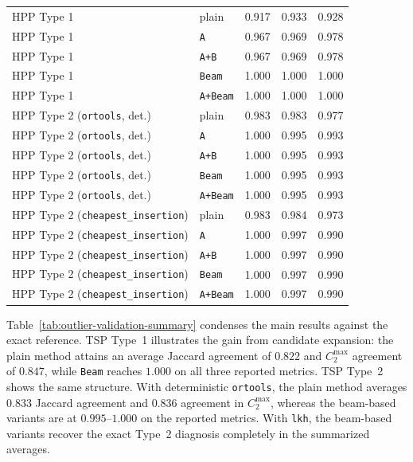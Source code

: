 \documentclass[preprint,12pt]{elsarticle}
\begin{document}
\begin{table}[htbp]
{\begin{tabular}{llccc}
\midrule
HPP Type 1 & plain & 0.917 & 0.933 & 0.928 \\
HPP Type 1 & \texttt{A} & 0.967 & 0.969 & 0.978 \\
HPP Type 1 & \texttt{A+B} & 0.967 & 0.969 & 0.978 \\
HPP Type 1 & \texttt{Beam} & 1.000 & 1.000 & 1.000 \\
HPP Type 1 & \texttt{A+Beam} & 1.000 & 1.000 & 1.000 \\
\midrule
HPP Type 2 (\texttt{ortools}, det.) & plain & 0.983 & 0.983 & 0.977 \\
HPP Type 2 (\texttt{ortools}, det.) & \texttt{A} & 1.000 & 0.995 & 0.993 \\
HPP Type 2 (\texttt{ortools}, det.) & \texttt{A+B} & 1.000 & 0.995 & 0.993 \\
HPP Type 2 (\texttt{ortools}, det.) & \texttt{Beam} & 1.000 & 0.995 & 0.993 \\
HPP Type 2 (\texttt{ortools}, det.) & \texttt{A+Beam} & 1.000 & 0.995 & 0.993 \\
\midrule
HPP Type 2 (\texttt{cheapest\_insertion}) & plain & 0.983 & 0.984 & 0.973 \\
HPP Type 2 (\texttt{cheapest\_insertion}) & \texttt{A} & 1.000 & 0.997 & 0.990 \\
HPP Type 2 (\texttt{cheapest\_insertion}) & \texttt{A+B} & 1.000 & 0.997 & 0.990 \\
HPP Type 2 (\texttt{cheapest\_insertion}) & \texttt{Beam} & 1.000 & 0.997 & 0.990 \\
HPP Type 2 (\texttt{cheapest\_insertion}) & \texttt{A+Beam} & 1.000 & 0.997 & 0.990 \\
\bottomrule
\end{tabular}
\par}
\end{table}

Table~\ref{tab:outlier-validation-summary} condenses the main results against the exact reference. TSP Type~1 illustrates the gain from candidate expansion: the plain method attains an average Jaccard agreement of $0.822$ and $C_2^{\max}$ agreement of $0.847$, while \texttt{Beam} reaches $1.000$ on all three reported metrics. TSP Type~2 shows the same structure. With deterministic \texttt{ortools}, the plain method averages $0.833$ Jaccard agreement and $0.836$ agreement in $C_2^{\max}$, whereas the beam-based variants are at $0.995$--$1.000$ on the reported metrics. With \texttt{lkh}, the beam-based variants recover the exact Type~2 diagnosis completely in the summarized averages.
\end{document}

